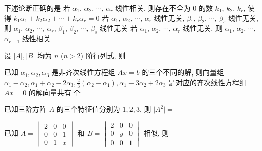 \begin{ti}
	下述论断正确的是 \kuo
	{若 $\alpha_1$, $\alpha_2$, $\cdots$, $\alpha_r$ 线性相关, 则存在不全为 0 的数 $k_1$, $k_2$, $k_r$, 使得 $k_1 \alpha_1 + k_2 \alpha_2 + \cdots + k_r \alpha_r = 0$}
	{若 $\alpha_1$, $\alpha_2$, $\cdots$, $\alpha_r$ 线性无关, $\beta_1$, $\beta_2$, $\cdots$, $\beta_s$ 线性无关, 则 $\alpha_1$, $\alpha_2$, $\cdots$, $\alpha_r$, $\beta_1$, $\beta_2$, $\cdots$, $\beta_s$ 线性无关}
	{若 $\alpha_1$, $\alpha_2$, $\cdots$, $\alpha_r$ 线性无关, 则 $\alpha_1$, $\alpha_2$, $\cdots$, $\alpha_{r-1}$ 线性相关}
\end{ti}

\begin{ti}
	设 $|A|,|B|$ 均为 $n$ ($n>2$) 阶行列式, 则 \kuo
\end{ti}

\begin{ti}
	已知 $\alpha_1,\alpha_2,\alpha_3$ 是非齐次线性方程组 $Ax=b$ 的三个不同的解, 则向量组 $\alpha_1-\alpha_2,\alpha_1+\alpha_2-2\alpha_3,\frac{2}{3}(\alpha_2-\alpha_1),\allowbreak\alpha_1-3\alpha_2+2\alpha_3$ 是对应的齐次线性方程组 $Ax=0$ 的解向量共有 \kuo{} 个
\end{ti}

\begin{ti}
	已知三阶方阵 $A$ 的三个特征值分别为 $1,2,3$, 则 $\bigl|A^2\bigr| = $ \kuo
\end{ti}

\begin{ti}
	已知 $A = \begin{vmatrix}
		2 & 0 & 0 \\ 0 & 0 & 1 \\ 0 & 1 & x
	\end{vmatrix}$ 和 $B = \begin{vmatrix}
		2 & 0 & 0 \\ 0 & y & 0 \\ 0 & 0 & 1
	\end{vmatrix}$ 相似, 则 \kuo
\end{ti}

